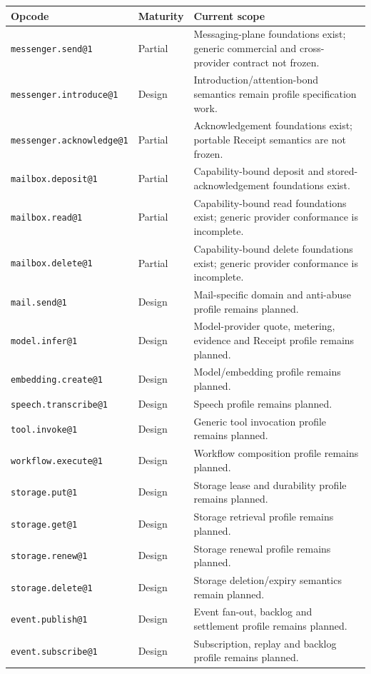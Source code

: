\documentclass[11pt,oneside]{article}
\newcommand{\opid}[1]{\texttt{#1}}
\begin{document}
\begin{longtable}{L{0.30\textwidth}L{0.16\textwidth}L{0.43\textwidth}}
\toprule
Opcode & Maturity & Current scope \\
\midrule
\endhead
\opid{messenger.send@1} & Partial & Messaging-plane foundations exist; generic commercial and cross-provider contract not frozen. \\
\opid{messenger.introduce@1} & Design & Introduction/attention-bond semantics remain profile specification work. \\
\opid{messenger.acknowledge@1} & Partial & Acknowledgement foundations exist; portable Receipt semantics are not frozen. \\
\opid{mailbox.deposit@1} & Partial & Capability-bound deposit and stored-acknowledgement foundations exist. \\
\opid{mailbox.read@1} & Partial & Capability-bound read foundations exist; generic provider conformance is incomplete. \\
\opid{mailbox.delete@1} & Partial & Capability-bound delete foundations exist; generic provider conformance is incomplete. \\
\opid{mail.send@1} & Design & Mail-specific domain and anti-abuse profile remains planned. \\
\opid{model.infer@1} & Design & Model-provider quote, metering, evidence and Receipt profile remains planned. \\
\opid{embedding.create@1} & Design & Model/embedding profile remains planned. \\
\opid{speech.transcribe@1} & Design & Speech profile remains planned. \\
\opid{tool.invoke@1} & Design & Generic tool invocation profile remains planned. \\
\opid{workflow.execute@1} & Design & Workflow composition profile remains planned. \\
\opid{storage.put@1} & Design & Storage lease and durability profile remains planned. \\
\opid{storage.get@1} & Design & Storage retrieval profile remains planned. \\
\opid{storage.renew@1} & Design & Storage renewal profile remains planned. \\
\opid{storage.delete@1} & Design & Storage deletion/expiry semantics remain planned. \\
\opid{event.publish@1} & Design & Event fan-out, backlog and settlement profile remains planned. \\
\opid{event.subscribe@1} & Design & Subscription, replay and backlog profile remains planned. \\

\end{longtable}
\end{document}
